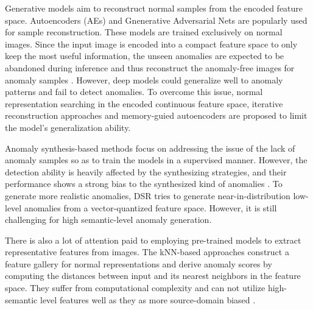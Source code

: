 \documentclass[10pt,twocolumn,letterpaper]{article}
\begin{document}
Generative models aim to reconstruct normal samples from the encoded feature space. Autoencoders (AEs) and Gnenerative Adversarial Nets \cite{goodfellow2020generative} are popularly used for sample reconstruction. These models are trained exclusively on normal images. Since the input image is encoded into a compact feature space to only keep the most useful information, the unseen anomalies are expected to be abandoned during inference and thus reconstruct the anomaly-free images for anomaly samples \cite{bergmann2018improving}. However, deep models could generalize well to anomaly patterns and fail to detect anomalies. To overcome this issue, normal representation searching \cite{schlegl2019f} in the encoded continuous feature space, iterative reconstruction approaches \cite{dehaene2020iterative} and memory-guied autoencoders \cite{gong2019memorizing, park2020learning} are proposed to limit the model's generalization ability.

Anomaly synthesis-based methods \cite{pourreza2021g2d, li2021cutpaste, zavrtanik2021draem} focus on addressing the issue of the lack of anomaly samples so as to train the models in a supervised manner. However, the detection ability is heavily affected by the synthesizing strategies, and their performance shows a strong bias to the synthesized kind of anomalies \cite{zavrtanik2022dsr, hendrycks2018deep}. To generate more realistic anomalies, DSR \cite{zavrtanik2022dsr} tries to generate near-in-distribution low-level anomalies from a vector-quantized feature space. However, it is still challenging for high semantic-level anomaly generation.

There is also a lot of attention paid to employing pre-trained models to extract representative features from images. The kNN-based approaches \cite{cohen2020sub, roth2022towards} construct a feature gallery for normal representations and derive anomaly scores by computing the distances between input and its nearest neighbors in the feature space. They suffer from computational complexity \cite{yu2021fastflow, deng2022anomaly} and can not utilize high-semantic level features well as they as more source-domain biased \cite{roth2022towards}.
\end{document}
